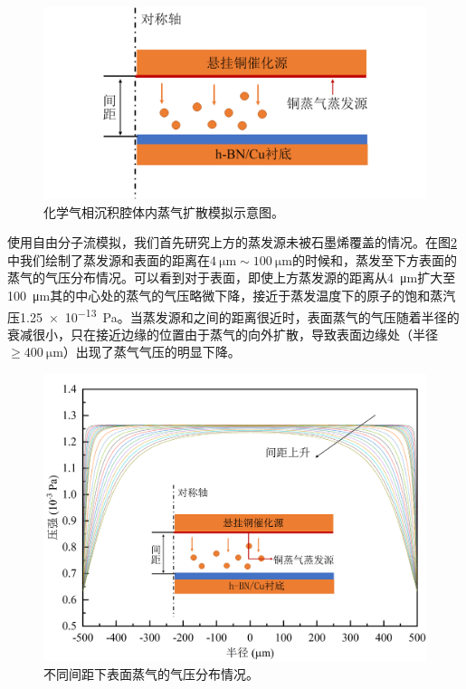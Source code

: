     \begin{figure}[htb]
        \includegraphics{pic/CG_diagram_FEM_structure.png}
        \caption{化学气相沉积腔体内蒸气扩散模拟示意图。}
        \label{fig:CG_diagram_FEM_structure}
    \end{figure}

    使用自由分子流模拟，我们首先研究上方的蒸发源未被石墨烯覆盖的情况。在图\ref{fig:CG_FEM_fullCu}中我们绘制了蒸发源和表面的距离在$\SI{4}{\micro\meter} \sim \SI{100}{\micro\meter}$的时候和，蒸发至下方表面的蒸气的气压分布情况。可以看到对于表面，即使上方蒸发源的距离从\SI{4}{\micro\meter}扩大至\SI{100}{\micro\meter}其的中心处的蒸气的气压略微下降，接近于蒸发温度下的原子的饱和蒸汽压\SI{1.25e-13}{\pascal}。当蒸发源和之间的距离很近时，表面蒸气的气压随着半径的衰减很小，只在接近边缘的位置由于蒸气的向外扩散，导致表面边缘处（半径$\geqslant \SI{400}{\micro\meter}$）出现了蒸气气压的明显下降。
    
    \begin{figure}[htb]
        \includegraphics{pic/CG_FEM_fullCu.png}
        \caption{不同间距下表面蒸气的气压分布情况。}
        \label{fig:CG_FEM_fullCu}
    \end{figure}

